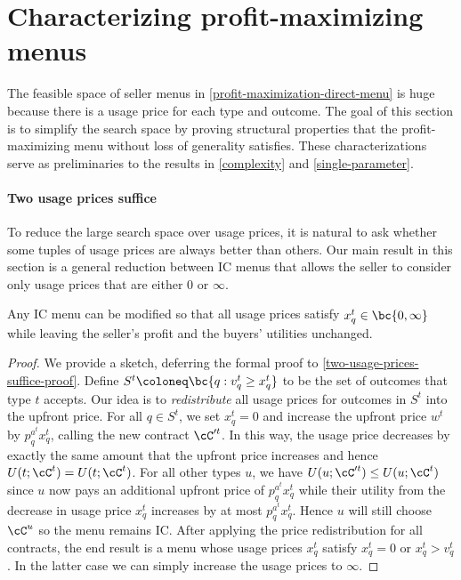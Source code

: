 \section{Characterizing profit-maximizing menus} \label{characterizations}

The feasible space of seller menus in \cref{profit-maximization-direct-menu} is huge because there is a usage price for each type and outcome. The goal of this section is to simplify the search space by proving structural properties that the profit-maximizing menu without loss of generality satisfies. These characterizations serve as preliminaries to the results in \cref{complexity} and \cref{single-parameter}.

\paragraph{Two usage prices suffice}

To reduce the large search space over usage prices, it is natural to ask whether some tuples of usage prices are always better than others. Our main result in this section is a general reduction between IC menus that allows the seller to consider only usage prices that are either 0 or $\infty$.

\begin{theorem} \label{two-usage-prices-suffice}
    Any IC menu can be modified so that all usage prices satisfy $x^t_q\in \bc{0, \infty}$ while leaving the seller's profit and the buyers' utilities unchanged.
\end{theorem}

\begin{proof}
    We provide a sketch, deferring the formal proof to \cref{two-usage-prices-suffice-proof}. Define $S^t \coloneq \bc{q: v^t_q \ge x^t_q}$ to be the set of outcomes that type $t$ accepts. Our idea is to \emph{redistribute} all usage prices for outcomes in $S^t$ into the upfront price. For all $q\in S^t$, we set $x^t_q = 0$ and increase the upfront price $w^t$ by $p^{a^t}_q x^t_q$, calling the new contract $\cC'^t$. In this way, the usage price decreases by exactly the same amount that the upfront price increases and hence $U(t;\cC^{t}) = U(t;\cC^t)$. For all other types $u$, we have $U(u;\cC'^t) \le U(u;\cC^t)$ since $u$ now pays an additional upfront price of $p^{a^t}_q x^t_q$ while their utility from the decrease in usage price $x^t_q$ increases by at most $p^{a^t}_q x^t_q$. Hence $u$ will still choose $\cC^u$ so the menu remains IC. After applying the price redistribution for all contracts, the end result is a menu whose usage prices $x^t_q$ satisfy $x^t_q = 0$ or $x^t_q > v^t_q$. In the latter case we can simply increase the usage prices to $\infty$.
\end{proof}

